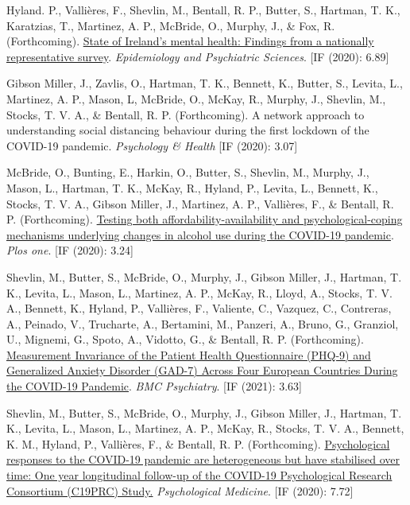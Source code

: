 \documentclass[12pt]{article}
\begin{document}
\begin{bibenum}
	\item Hyland. P., Vallières, F., Shevlin, M., 
	Bentall, R. P., Butter, S., Hartman, T. K.,  
	Karatzias, T., Martinez, A. P., McBride, O., 
	Murphy, J., \& Fox, R. (Forthcoming). 
	\href{}
	{State of Ireland's mental health: Findings from a nationally representative survey}. 
	\emph{Epidemiology and Psychiatric Sciences}. [IF (2020): 6.89]


\item Gibson Miller, J., Zavlis, O., Hartman, T. K., Bennett, K., Butter, S., Levita, L., Martinez, A. P., Mason, L, McBride, O., McKay, R., Murphy, J., 
	Shevlin, M., Stocks, T. V. A., \& Bentall, R. P. (Forthcoming). A network approach to understanding social distancing behaviour during the first lockdown of the COVID-19 pandemic. \textit{Psychology \& Health} [IF (2020): 3.07]

\item McBride, O., Bunting, E., Harkin, O., Butter, S.,  Shevlin, M., Murphy, J., Mason, L., Hartman, T. K., McKay, R., Hyland, P., Levita, L.,  Bennett, K., Stocks, T. V. A., Gibson Miller, J., Martinez, A. P., Vallières, F., \& Bentall, R. P. (Forthcoming). \href{https://psyarxiv.com/xby9r/}{Testing both affordability-availability and psychological-coping mechanisms underlying changes in alcohol use during the COVID-19 pandemic}.
	\emph{Plos one}. [IF (2020): 3.24]

\item Shevlin, M., Butter, S., McBride, O., Murphy, J., Gibson Miller, J., Hartman, T. K., Levita, L., Mason, L., Martinez, A. P., McKay, R., Lloyd, A., Stocks, T. V. A., Bennett, K., Hyland, P., Vallières, F., Valiente, C., Vazquez, C., Contreras, A., Peinado, V., Trucharte, A., Bertamini, M., Panzeri, A., Bruno, G., Granziol, U., Mignemi, G., Spoto, A., Vidotto, G., \& Bentall, R. P. (Forthcoming). \href{https://psyarxiv.com/fwga8/}{Measurement Invariance of the Patient Health Questionnaire (PHQ-9) and Generalized Anxiety Disorder (GAD-7) Across Four European Countries During the COVID-19 Pandemic}. 
	\emph{BMC Psychiatry}. [IF (2021): 3.63]


	\item Shevlin, M., Butter, S., McBride, O., Murphy, J., Gibson Miller, J., Hartman, T. K.,
	Levita, L., Mason, L., Martinez, A. P.,  
	McKay, R., Stocks, T. V. A., Bennett, K. M.,  Hyland, P., Vallières, F., \& Bentall, R. P. (Forthcoming). 
		\href{https://psyarxiv.com/42dfu/}
		{Psychological responses to the COVID-19 pandemic are heterogeneous but have stabilised over time: 
		One year longitudinal follow-up of the COVID-19 Psychological Research Consortium (C19PRC) Study.}
		\emph{Psychological Medicine}. [IF (2020): 7.72]
		

\end{bibenum}
\end{document}
